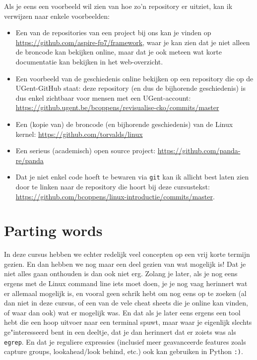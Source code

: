 \documentclass[a4paper,twoside,openany]{memoir}
\begin{document}
Als je eens een voorbeeld wil zien van hoe zo'n repository er uitziet, kan ik
verwijzen naar enkele voorbeelden:
\begin{itemize}
\item Een van de repositories van een project bij ons kan je vinden op
  \url{https://github.com/aspire-fp7/framework}, waar je kan zien dat je niet
    alleen de broncode kan bekijken online, maar dat je ook meteen wat korte
    documentatie kan bekijken in het web-overzicht.
\item Een voorbeeld van de geschiedenis online bekijken op een repository die
  op de UGent-GitHub staat: deze repository (en dus de bijhorende geschiedenis)
    is dus enkel zichtbaar voor mensen met een UGent-account:
    \url{https://github.ugent.be/bcoppens/revisualise-cko/commits/master}
\item Een (kopie van) de broncode (en bijhorende geschiedenis) van de Linux
  kernel: \url{https://github.com/torvalds/linux}
\item Een serieus (academisch) open source project:
  \url{https://github.com/panda-re/panda}
\item Dat je niet enkel code hoeft te bewaren via \verb!git! kan ik allicht
  best laten zien door te linken naar de repository die hoort bij deze
    cursustekst:
    \url{https://github.com/bcoppens/linux-introductie/commits/master}.
\end{itemize}

\chapter{Parting words}

In deze cursus hebben we echter redelijk veel concepten op een vrij korte
termijn gezien. En dan hebben we nog maar een deel gezien van wat mogelijk
is! Dat je niet alles gaan onthouden is dan ook niet erg. Zolang je
later, als je nog eens ergens met de Linux command line iets moet doen, je je
nog vaag herinnert wat er allemaal mogelijk is, en vooral geen schrik hebt om
nog eens op te zoeken (al dan niet in deze cursus, of een van de vele cheat
sheets die je online kan vinden, of waar dan ook) wat er mogelijk was. En dat
als je later eens ergens een tool hebt die een hoop uitvoer naar een terminal
spuwt, maar waar je eigenlijk slechts ge"interesseerd bent in een deeltje, dat
je dan herinnert dat er zoiets was als \verb!egrep!. En dat je reguliere
expressies (inclusief meer geavanceerde features zoals capture groups,
lookahead/look behind, etc.) ook kan gebruiken in Python \verb!:)!.
\end{document}
